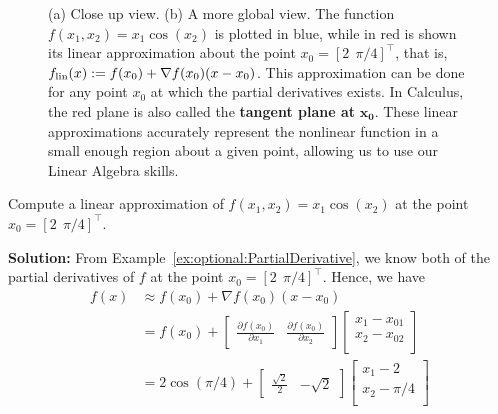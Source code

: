 \vspace*{.2cm}
\begin{figure}[hbt!]
    \centering
    \caption[]{(a) Close up view. (b) A more global view. The function $f(x_1, x_2) = x_1 \cos(x_2)$ is plotted in blue, while in red is shown its linear approximation about the point $x_0=[2~~\pi/4]^\top$, that is,  $f_{\rm lin}(x) :=f(x_0) + \nabla f(x_0) (x-x_0)$. This approximation can be done for any point $x_0$ at which the partial derivatives exists. In Calculus, the red plane is also called the \textbf{tangent plane at} $\mathbf{x_0}$. These linear approximations accurately represent the nonlinear function in a small enough region about a given point, allowing us to use our Linear Algebra skills. 
    }
    \label{fig:optional:VectorLinearApprox}
    \end{figure}

\vspace*{.2cm}

\begin{example} 
\label{ex:optional:Gradient} 
Compute a linear approximation of $f(x_1, x_2) = x_1 \cos(x_2)$ at the point $x_0=[2~~\pi/4]^\top$.
\end{example}

\textbf{Solution:} From Example~\ref{ex:optional:PartialDerivative}, we know both of the partial derivatives of $f$ at the point $x_0=[2~~\pi/4]^\top$. Hence, we have
\begin{equation}
    \label{eq:optional:gradientExample}
    \begin{aligned}
  f(x) &\approx f(x_0) + \nabla f(x_0) (x-x_0)\\
    &= f(x_0)  + \left[\begin{array}{cc}
        \frac{\partial f(x_0)}{\partial x_1} &  \frac{\partial f(x_0)}{\partial x_2}
    \end{array} \right]  \left[\begin{array}{c}
        x_1-x_{01} \\
        x_2-x_{02} \\
           \end{array} \right]\\
    &= 2 \cos(\pi/4) + \left[
    \begin{array}{cc}
        \frac{\sqrt{2}}{2} & -\sqrt{2}\end{array} \right] \left[\begin{array}{c}
        x_1-2 \\
        x_2-\pi/4 \\
           \end{array} \right]
    \end{aligned}
\end{equation}

